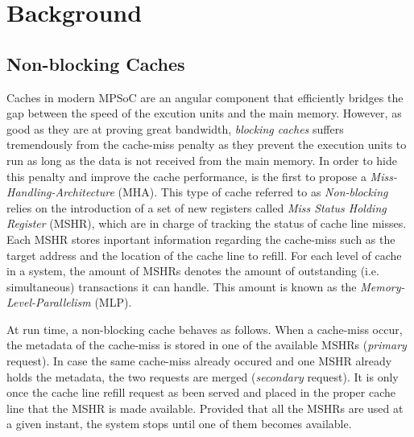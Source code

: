\section{Background}
    \subsection{Non-blocking Caches}
        Caches in modern MPSoC are an angular component that efficiently bridges the gap between the speed of the excution units and  the main memory.
        However, as good as they are at proving great bandwidth, \emph{blocking caches} suffers tremendously from the cache-miss penalty as they prevent the execution units to run as long as the data is not received from the main memory.
        In order to hide this penalty and improve the cache performance, \cite{Kroft} is the first to propose a \emph{Miss-Handling-Architecture} (MHA).
        This type of cache referred to as \emph{Non-blocking} relies on the introduction of a set of new registers called \emph{Miss Status Holding Register} (MSHR), which are in charge of tracking the status of cache line misses.
        Each MSHR stores inportant information regarding the cache-miss such as the target address and the location of the cache line to refill.
        For each level of cache in a system, the amount of MSHRs denotes the amount of outstanding (i.e. simultaneous) transactions it can handle.
        This amount is known as the \emph{Memory-Level-Parallelism} (MLP).

        At run time, a non-blocking cache behaves as follows. When a cache-miss occur, the metadata of the cache-miss is stored in one of the available MSHRs (\emph{primary} request). In case the same cache-miss already occured and one MSHR already holds the metadata, the two requests are merged (\emph{secondary} request). It is only once the cache line refill request as been served and placed in the proper cache line that the MSHR is made available. Provided that all the MSHRs are used at a given instant, the system stops until one of them becomes available.

